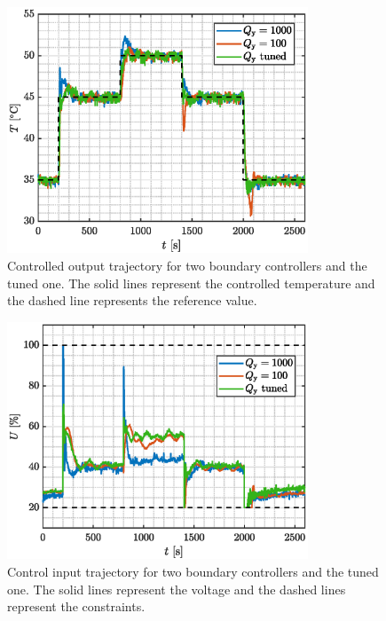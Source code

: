 \documentclass[preprint,12pt]{elsarticle}
\begin{document}
\begin{figure}
	\begin{center}
		\includegraphics[width=0.8\textwidth]{images/CV}
		\caption{Controlled output trajectory for two boundary controllers and the tuned one. The solid lines represent the controlled temperature and the dashed line represents the reference value.}
		\label{fig:CV}
	\end{center}
\end{figure}

\begin{figure}
	\begin{center}
		\includegraphics[width=0.8\textwidth]{images/MV}
		\caption{Control input trajectory for two boundary controllers and the tuned one. The solid lines represent the voltage and the dashed lines represent the constraints.}
		\label{fig:MV}
	\end{center}
\end{figure}
\end{document}
